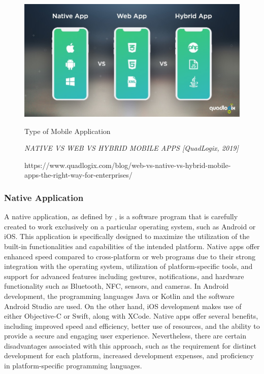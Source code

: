 \begin{figure}[h]
    \centering
    \includegraphics[width=1.0\linewidth]{mainmatter/images/typeapp.jpg}
    \caption{Type of Mobile Application}
    \caption*{\textit{NATIVE VS WEB VS HYBRID MOBILE APPS [QuadLogix, 2019]}}
    \caption*{https://www.quadlogix.com/blog/web-vs-native-vs-hybrid-mobile-apps-the-right-way-for-enterprises/}
    \label{fig:myfig9}
\end{figure}

\subsubsection{Native Application}
A native application, as defined by \textcite{syeed21}, is a software program that is carefully created to work exclusively on a particular operating system, such as Android or iOS. This application is specifically designed to maximize the utilization of the built-in functionalities and capabilities of the intended platform. Native apps offer enhanced speed compared to cross-platform or web programs due to their strong integration with the operating system, utilization of platform-specific tools, and support for advanced features including gestures, notifications, and hardware functionality such as Bluetooth, NFC, sensors, and cameras. In Android development, the programming languages Java or Kotlin and the software Android Studio are used. On the other hand, iOS development makes use of either Objective-C or Swift, along with XCode. Native apps offer several benefits, including improved speed and efficiency, better use of resources, and the ability to provide a secure and engaging user experience. Nevertheless, there are certain disadvantages associated with this approach, such as the requirement for distinct development for each platform, increased development expenses, and proficiency in platform-specific programming languages.


